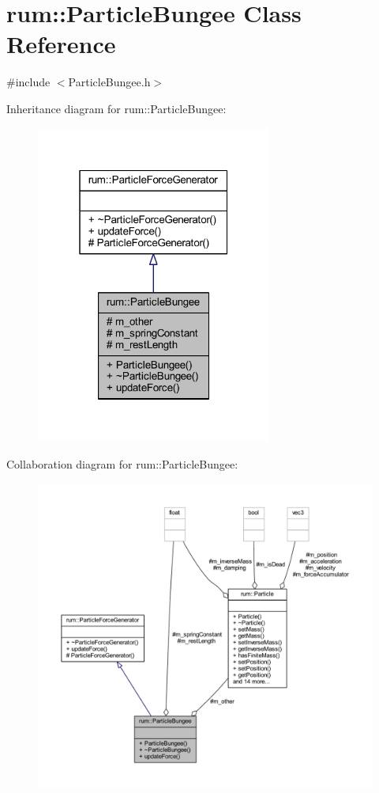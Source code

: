 \hypertarget{classrum_1_1_particle_bungee}{}\section{rum\+:\+:Particle\+Bungee Class Reference}
\label{classrum_1_1_particle_bungee}


{\ttfamily \#include $<$Particle\+Bungee.\+h$>$}



Inheritance diagram for rum\+:\+:Particle\+Bungee\+:\nopagebreak
\begin{figure}[H]
\begin{center}
\leavevmode
\includegraphics[width=220pt]{classrum_1_1_particle_bungee__inherit__graph}
\end{center}
\end{figure}


Collaboration diagram for rum\+:\+:Particle\+Bungee\+:\nopagebreak
\begin{figure}[H]
\begin{center}
\leavevmode
\includegraphics[width=350pt]{classrum_1_1_particle_bungee__coll__graph}
\end{center}
\end{figure}
